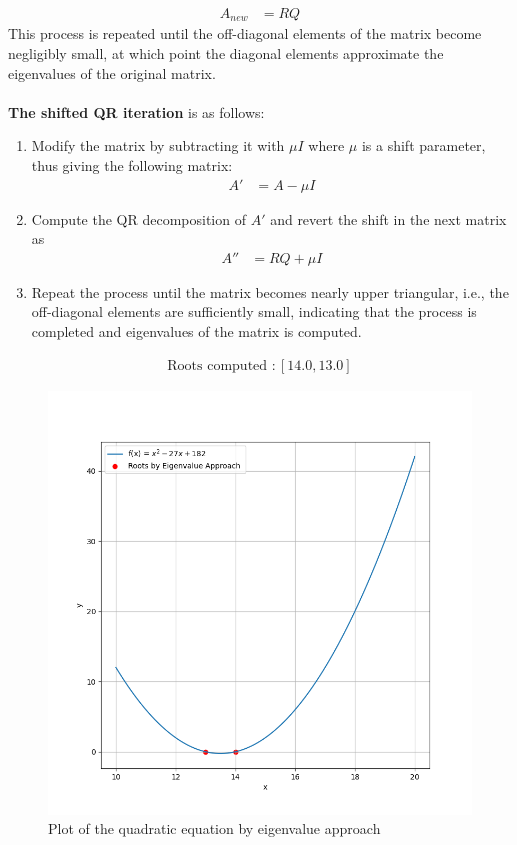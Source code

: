 \documentclass[journal]{IEEEtran}
\begin{document}
{\begin{align}
A_{new}&=RQ
\end{align}
This process is repeated until the off-diagonal elements of the matrix become negligibly small, at which point the diagonal elements approximate the eigenvalues of the original matrix.\\ \\
\textbf{The shifted QR iteration} is as follows:
\begin{enumerate}
    \item Modify the matrix by subtracting it with $\mu I$ where $\mu$ is a shift parameter, thus giving the following matrix:
    \begin{align}
    A' &= A - \mu I
    \end{align}
    \item Compute the QR decomposition of $A'$ and revert the shift in the next matrix as 
    \begin{align}
    A'' &= RQ + \mu I
    \end{align}
    \item Repeat the process until the matrix becomes nearly upper triangular, i.e., the off-diagonal elements are sufficiently small, indicating that the process is completed and eigenvalues of the matrix is computed.
\end{enumerate}
\begin{align}
    \text{Roots computed :}\, [14.0, 13.0]
\end{align}

\begin{figure}[h]
    \centering
    \includegraphics[width=\columnwidth]{plots/plot2.png}
    \caption{Plot of the quadratic equation by eigenvalue approach}
    \label{fig:Plot1}
    \end{figure}
}
\end{document}
